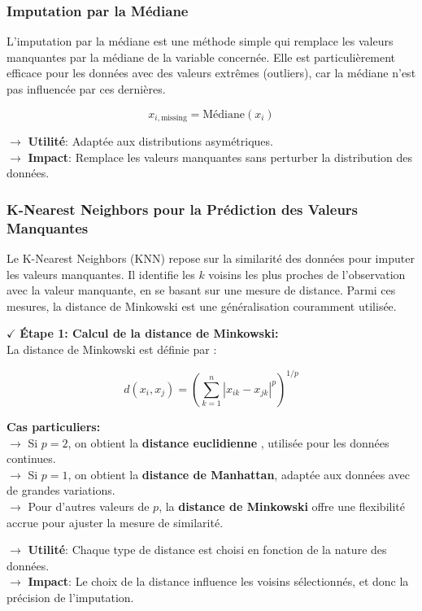 \subsubsection{Imputation par la Médiane}

L’imputation par la médiane est une méthode simple qui remplace les valeurs manquantes par la médiane de la variable concernée. Elle est particulièrement efficace pour les données avec des valeurs extrêmes (outliers), car la médiane n'est pas influencée par ces dernières.

\[
x_{i,\text{missing}} = \text{Médiane}(x_i)
\]

\noindent \textbf{\(\rightarrow\)} \textbf{Utilité}: Adaptée aux distributions asymétriques.\\
\textbf{\(\rightarrow\)} \textbf{Impact}: Remplace les valeurs manquantes sans perturber la distribution des données.

\subsubsection{K-Nearest Neighbors pour la Prédiction des Valeurs Manquantes}

Le K-Nearest Neighbors (KNN) repose sur la similarité des données pour imputer les valeurs manquantes. Il identifie les \(k\) voisins les plus proches de l'observation avec la valeur manquante, en se basant sur une mesure de distance. Parmi ces mesures, la distance de Minkowski est une généralisation couramment utilisée.

\textbf{\(\checkmark\)} \textbf{Étape 1: Calcul de la distance de Minkowski:} \\
La distance de Minkowski \cite{min} est définie par :

\[
d(x_i, x_j) = \left( \sum_{k=1}^{n} |x_{ik} - x_{jk}|^p \right)^{1/p}
\]

\textbf{Cas particuliers:}\\
\textbf{\(\rightarrow\)} Si \( p = 2 \), on obtient la \textbf{distance euclidienne} \cite{euc}, utilisée pour les données continues.\\
\textbf{\(\rightarrow\)} Si \( p = 1 \), on obtient la \textbf{distance de Manhattan}, adaptée aux données avec de grandes variations.\\
\textbf{\(\rightarrow\)} Pour d'autres valeurs de \( p \), la \textbf{distance de Minkowski} offre une flexibilité accrue pour ajuster la mesure de similarité.

\noindent \textbf{\(\rightarrow\)} \textbf{Utilité}: Chaque type de distance est choisi en fonction de la nature des données.\\
\textbf{\(\rightarrow\)} \textbf{Impact}: Le choix de la distance influence les voisins sélectionnés, et donc la précision de l'imputation.

